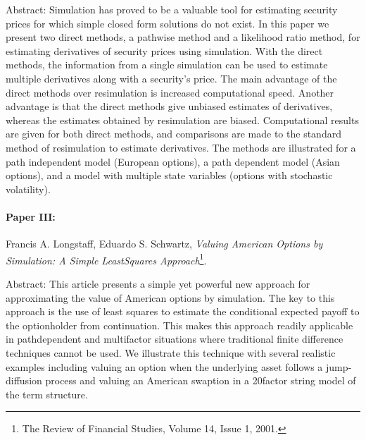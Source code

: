 Abstract: Simulation has proved to be a valuable tool for estimating security prices for which simple closed form solutions do not exist. In this paper we present two direct methods, a pathwise method and a likelihood ratio method, for estimating derivatives of security prices using simulation. With the direct methods, the information from a single simulation can be used to estimate multiple derivatives along with a security's price. The main advantage of the direct methods over resimulation is increased computational speed. Another advantage is that the direct methods give unbiased estimates of derivatives, whereas the estimates obtained by resimulation are biased. Computational results are given for both direct methods, and comparisons are made to the standard method of resimulation to estimate derivatives. The methods are illustrated for a path independent model (European options), a path dependent model (Asian options), and a model with multiple state variables (options with stochastic volatility).

\paragraph{Paper III:} Francis A. Longstaff, Eduardo S. Schwartz, \emph{Valuing American Options by Simulation: A Simple Least­Squares Approach}\footnote{The Review of Financial Studies, Volume 14, Issue 1, 2001.}.

Abstract: This article presents a simple yet powerful new approach for approximating the value of American options by simulation. The key to this approach is the use of least squares to estimate the conditional expected payoff to the optionholder from continuation. This makes this approach readily applicable in path­dependent and multifactor situations where traditional finite difference techniques cannot be used. We illustrate this technique with several realistic examples including valuing an option when the underlying asset follows a jump­diffusion process and valuing an American swaption in a 20­factor string model of the term structure.
